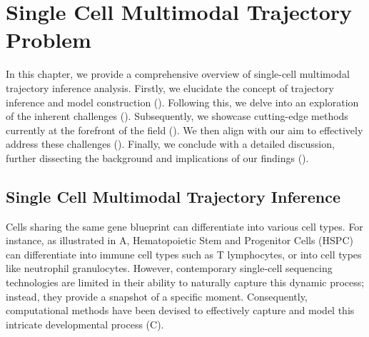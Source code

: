 %
%
\chapter{Single Cell Multimodal Trajectory Problem}
\label{chapter:problem_TI}
\graphicspath{{chapter6/figs/}}

In this chapter, we provide a comprehensive overview of single-cell multimodal trajectory inference analysis. Firstly, we elucidate the concept of trajectory inference and model construction (). Following this, we delve into an exploration of the inherent challenges (). Subsequently, we showcase cutting-edge methods currently at the forefront of the field (). We then align with our aim to effectively address these challenges (). Finally, we conclude with a detailed discussion, further dissecting the background and implications of our findings ().



\section{Single Cell Multimodal Trajectory Inference}
\label{bgTI:definition}
Cells sharing the same gene blueprint can differentiate into various cell types. For instance, as illustrated in A, Hematopoietic Stem and Progenitor Cells (HSPC) can differentiate into immune cell types such as T lymphocytes, or into cell types like neutrophil granulocytes. However, contemporary single-cell sequencing technologies are limited in their ability to naturally capture this dynamic process; instead, they provide a snapshot of a specific moment. Consequently, computational methods have been devised to effectively capture and model this intricate developmental process (C). 

